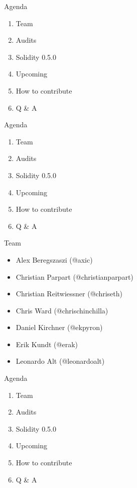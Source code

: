 \documentclass[aspectratio=169,10pt]{beamer}
\begin{document}
{{
}
\begin{frame}
\maketitle
\end{frame}
}

\begin{frame}{Agenda}
	\begin{enumerate}
  \item Team
  \item Audits
	\item Solidity 0.5.0
	\item Upcoming
	\item How to contribute
	\item Q \& A
	\end{enumerate}
\end{frame}

\begin{frame}{Agenda}
	\begin{enumerate}
  \item \alert{Team}
  \item Audits
	\item Solidity 0.5.0
	\item Upcoming
	\item How to contribute
	\item Q \& A
	\end{enumerate}
\end{frame}

\begin{frame}{Team}
  \begin{itemize}
    \item Alex Beregszaszi (@axic)
    \item \alert{Christian Parpart (@christianparpart)}
    \item Christian Reitwiessner (@chriseth)
    \item \alert{Chris Ward (@chrischinchilla)}
		\item \alert{Daniel Kirchner (@ekpyron)}
		\item \alert{Erik Kundt (@erak)}
		\item \alert{Leonardo Alt (@leonardoalt)}
	\end{itemize}
\end{frame}

\begin{frame}{Agenda}
	\begin{enumerate}
  \item Team
  \item \alert{Audits}
	\item Solidity 0.5.0
	\item Upcoming
	\item How to contribute
	\item Q \& A
	\end{enumerate}
\end{frame}
\end{document}
